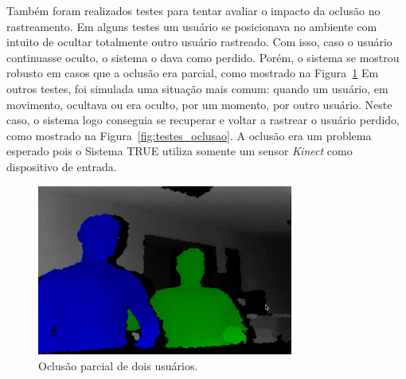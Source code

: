 	Também foram realizados testes para tentar avaliar o impacto da oclusão no rastreamento. Em alguns testes um usuário se posicionava no ambiente com intuito de ocultar totalmente outro usuário rastreado. Com isso, caso o usuário continuasse oculto, o sistema o dava como perdido. Porém, o sistema se mostrou robusto em casos que a oclusão era parcial, como mostrado na Figura~\ref{fig:testes_oclusao_sucesso} Em outros testes, foi simulada uma situação mais comum: quando um usuário, em movimento, ocultava ou era oculto, por um momento, por outro usuário. Neste caso, o sistema logo conseguia se recuperar e voltar a rastrear o usuário perdido, como mostrado na Figura~\ref{fig:testes_oclusao}. A oclusão era um problema esperado pois o Sistema TRUE utiliza somente um sensor \textit{Kinect} como dispositivo de entrada.
		
		\begin{figure}[htb]
			\begin{center}
				\includegraphics[width=0.75\textwidth]{figuras/5.Testes/oclusao/oclusao_corretamente.png}
			\end{center}
			\caption{Oclusão parcial de dois usuários.}
			\label{fig:testes_oclusao_sucesso}
		\end{figure}
	
